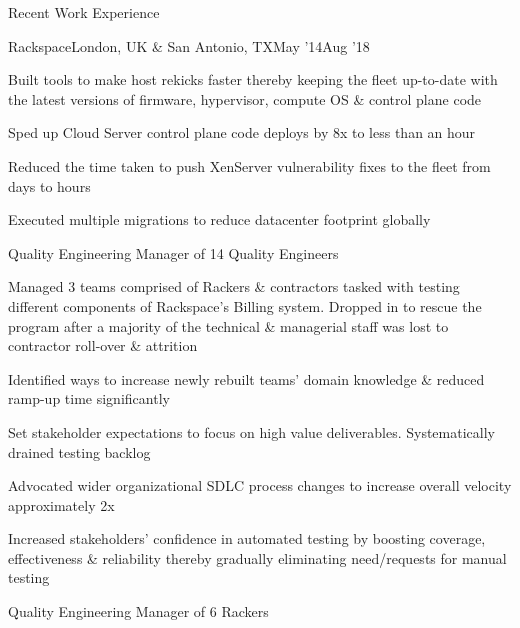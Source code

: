 \documentclass{resume} %
\begin{document}
\begin{rSection}{Recent Work Experience}
\begin{rSubsection}{Rackspace}{London, UK \& San Antonio, TX}{May '14}{Aug '18}
    \item Built tools to make host rekicks faster thereby keeping the fleet up-to-date with the latest versions of firmware, hypervisor, compute OS \& control plane code
    \item Sped up Cloud Server control plane code deploys by 8x to less than an hour
    \item Reduced the time taken to push XenServer vulnerability fixes to the fleet from days to hours
    \item Executed multiple migrations to reduce datacenter footprint globally

\end{rSubsection}\vspace{-1em}

  
\begin{rSubsection}{}{}{}{}
{Quality Engineering Manager of 14 Quality Engineers}
  \item Managed 3 teams comprised of Rackers \& contractors tasked with testing different components of Rackspace's Billing system. Dropped in to rescue the program after a majority of the technical \& managerial staff was lost to contractor roll-over \& attrition
\item Identified ways to increase newly rebuilt teams' domain knowledge \& reduced ramp-up time significantly
\item Set stakeholder expectations to focus on high value deliverables. Systematically drained testing backlog
\item Advocated wider organizational SDLC process changes to increase overall velocity approximately 2x
\item Increased stakeholders' confidence in automated testing by boosting coverage, effectiveness \& reliability thereby gradually eliminating need/requests for manual testing
  
\end{rSubsection}\vspace{-1em}



\begin{rSubsection}{}{}{}{}
{Quality Engineering Manager of 6 Rackers}


\end{rSubsection}
\end{rSection}
\end{document}
